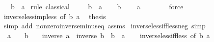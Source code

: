 \begin{isabellebody}
\ \ \ {\isachardoublequoteopen}b\ {\isacharless}{\kern0pt}\ a{\isachardoublequoteclose}\isanewline
%
\isadelimproof
%
\endisadelimproof
%
\isatagproof
{}\isamarkupfalse%
\ {\isacharparenleft}{\kern0pt}rule\ classical{\isacharparenright}{\kern0pt}\isanewline
\ \ \isamarkupfalse%
\ {\isachardoublequoteopen}{\isasymnot}\ b\ {\isacharless}{\kern0pt}\ a{\isachardoublequoteclose}\isanewline
\ \ \isamarkupfalse%
\ {\isacartoucheopen}b\ {\isacharless}{\kern0pt}\ {}{\isacartoucheclose}\ \isamarkupfalse%
\ {\isachardoublequoteopen}a\ {\isacharless}{\kern0pt}\ {}{\isachardoublequoteclose}\isanewline
\ \ \ \ \isamarkupfalse%
\ force\isanewline
\ \ \isamarkupfalse%
\ inverse{\isacharunderscore}{\kern0pt}less{\isacharunderscore}{\kern0pt}imp{\isacharunderscore}{\kern0pt}less\ {\isacharbrackleft}{\kern0pt}of\ {\isachardoublequoteopen}{\isacharminus}{\kern0pt}b{\isachardoublequoteclose}\ {\isachardoublequoteopen}{\isacharminus}{\kern0pt}a{\isachardoublequoteclose}{\isacharbrackright}{\kern0pt}\ \isamarkupfalse%
\ {\isacharquery}{\kern0pt}thesis\isanewline
\ \ \ \ \isamarkupfalse%
\ {\isacharparenleft}{\kern0pt}simp\ add{\isacharcolon}{\kern0pt}\ nonzero{\isacharunderscore}{\kern0pt}inverse{\isacharunderscore}{\kern0pt}minus{\isacharunderscore}{\kern0pt}eq\ assms{\isacharparenright}{\kern0pt}\isanewline
{}\isamarkupfalse%
%
\endisatagproof
{\isafoldproof}%
%
\isadelimproof
\isanewline
%
\endisadelimproof
\isanewline
{}\isamarkupfalse%
\ inverse{\isacharunderscore}{\kern0pt}less{\isacharunderscore}{\kern0pt}iff{\isacharunderscore}{\kern0pt}less{\isacharunderscore}{\kern0pt}neg\ {\isacharbrackleft}{\kern0pt}simp{\isacharbrackright}{\kern0pt}{\isacharcolon}{\kern0pt}\isanewline
\ \ {\isachardoublequoteopen}a\ {\isacharless}{\kern0pt}\ {}\ {\isasymLongrightarrow}\ b\ {\isacharless}{\kern0pt}\ {}\ {\isasymLongrightarrow}\ inverse\ a\ {\isacharless}{\kern0pt}\ inverse\ b\ {\isasymlongleftrightarrow}\ b\ {\isacharless}{\kern0pt}\ a{\isachardoublequoteclose}\isanewline
%
\isadelimproof
\ \ %
\endisadelimproof
%
\isatagproof
{}\isamarkupfalse%
\ inverse{\isacharunderscore}{\kern0pt}less{\isacharunderscore}{\kern0pt}iff{\isacharunderscore}{\kern0pt}less\ {\isacharbrackleft}{\kern0pt}of\ {\isachardoublequoteopen}{\isacharminus}{\kern0pt}b{\isachardoublequoteclose}\ {\isachardoublequoteopen}{\isacharminus}{\kern0pt}a{\isachardoublequoteclose}{\isacharbrackright}{\kern0pt}\isanewline

\end{isabellebody}
